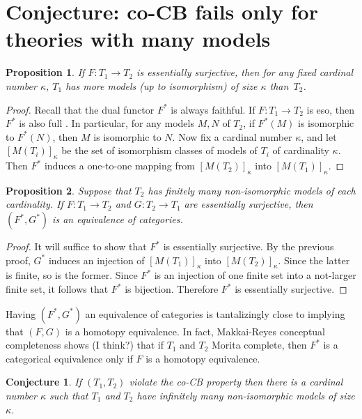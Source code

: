 \documentclass[12pt]{article}
\newtheorem*{conj}{Conjecture}
\newtheorem*{prop}{Proposition}
\theoremstyle{definition}
\newcommand{\3}{\mathcal}
\begin{document}
\section{Conjecture: co-CB fails only for theories with many models}

\begin{prop} If $F:T_1\to T_2$ is essentially surjective, then for any
  fixed cardinal number $\kappa$, $T_1$ has more models (up to
  isomorphism) of size $\kappa$ than~$T_2$. \end{prop}

\begin{proof} Recall that the dual functor $F^*$ is always
  faithful. If $F:T_1\to T_2$ is eso, then $F^*$ is also full
  \citep[Prop 6.6.13]{tlps}. In particular, for any models $M,N$ of
  $T_2$, if $F^*(M)$ is isomorphic to $F^*(N)$, then $M$ is isomorphic
  to $N$. Now fix a cardinal number $\kappa$, and let
  $[M(T_i)]_\kappa$ be the set of isomorphism classes of models of
  $T_i$ of cardinality $\kappa$. Then $F^*$ induces a one-to-one
  mapping from $[M(T_2)]_\kappa$ into $[M(T_1)]_\kappa$. \end{proof}

\begin{prop} Suppose that $T_2$ has finitely many non-isomorphic
  models of each cardinality. If $F:T_1\to T_2$ and $G:T_2\to T_1$ are
  essentially surjective, then $(F^*,G^*)$ is an equivalence of
  categories. \end{prop}

\begin{proof} It will suffice to show that $F^*$ is essentially
  surjective. By the previous proof, $G^*$ induces an injection of
  $[M(T_1)]_\kappa$ into $[M(T_2)]_\kappa$. Since the latter is
  finite, so is the former. Since $F^*$ is an injection of one finite
  set into a not-larger finite set, it follows that $F^*$ is
  bijection. Therefore $F^*$ is essentially surjective. \end{proof}

Having $(F^*,G^*)$ an equivalence of categories is tantalizingly close
to implying that $(F,G)$ is a homotopy equivalence. In fact,
Makkai-Reyes conceptual completeness shows (I think?) that if $T_1$
and $T_2$ Morita complete, then $F^*$ is a categorical equivalence
only if $F$ is a homotopy equivalence.

\begin{conj} If $(T_1,T_2)$ violate the co-CB property then there is a
  cardinal number $\kappa$ such that $T_1$ and $T_2$ have infinitely
  many non-isomorphic models of size $\kappa$. \end{conj}
\end{document}
